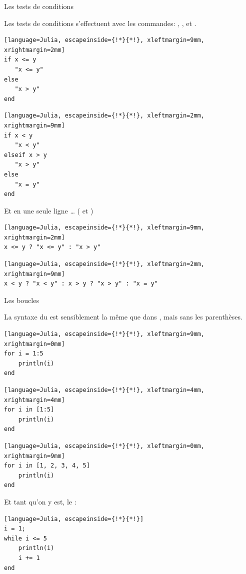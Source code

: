 \begin{frame}[containsverbatim]{Les tests de conditions}
\par{Les tests de conditions s'effectuent avec les commandes: \newline {}, ,  et .}
\vspace{-2ex}
\begin{multicols}{2}
\begin{lstlisting}[language=Julia, escapeinside={!*}{*!}, xleftmargin=9mm, xrightmargin=2mm]
if x <= y
   "x <= y"
else
   "x > y"
end
\end{lstlisting}
\begin{lstlisting}[language=Julia, escapeinside={!*}{*!}, xleftmargin=2mm, xrightmargin=9mm]
if x < y
   "x < y"
elseif x > y
   "x > y"
else
   "x = y"
end
\end{lstlisting}
\end{multicols}
\par{Et en une seule ligne \dots{} ( et \cmdb{\hspace{-1.5ex}:})}
\vspace{-2ex}
\begin{multicols}{2}
\begin{lstlisting}[language=Julia, escapeinside={!*}{*!}, xleftmargin=9mm, xrightmargin=2mm]
x <= y ? "x <= y" : "x > y"
\end{lstlisting}
\begin{lstlisting}[language=Julia, escapeinside={!*}{*!}, xleftmargin=2mm, xrightmargin=9mm]
x < y ? "x < y" : x > y ? "x > y" : "x = y"
\end{lstlisting}
\end{multicols}
\end{frame}


\begin{frame}[containsverbatim]{Les boucles}
\par{La syntaxe du  est sensiblement la même que dans {\raisebox{-0.5ex}{\R}}, mais sans les parenthèses.}
\vspace{-2ex}
\begin{multicols}{3}
\begin{lstlisting}[language=Julia, escapeinside={!*}{*!}, xleftmargin=9mm, xrightmargin=0mm]
for i = 1:5
    println(i)
end
\end{lstlisting}
\begin{lstlisting}[language=Julia, escapeinside={!*}{*!}, xleftmargin=4mm, xrightmargin=4mm]
for i in [1:5]
    println(i)
end
\end{lstlisting}
\begin{lstlisting}[language=Julia, escapeinside={!*}{*!}, xleftmargin=0mm, xrightmargin=9mm]
for i in [1, 2, 3, 4, 5]
    println(i)
end
\end{lstlisting}
\end{multicols}
\par{Et tant qu'on y est, le :}
\begin{lstlisting}[language=Julia, escapeinside={!*}{*!}]
i = 1;
while i <= 5
    println(i)
    i += 1
end
\end{lstlisting}
\end{frame}



